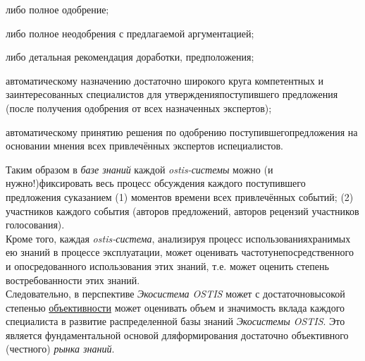\begin{scnsubstruct}
{\begin{scnitemize}
\begin{scnitemizeii}
                \item либо полное одобрение;
                \item либо полное неодобрения с предлагаемой аргументацией;
                \item либо детальная рекомендация доработки, предположения;
            \end{scnitemizeii}
            \item автоматическому назначению достаточно широкого круга компетентных и заинтересованных специалистов для утвержденияпоступившего предложения (после получения одобрения от всех назначенных экспертов);
            \item автоматическому принятию решения по одобрению поступившегопредложения на основании мнения всех привлечённых экспертов испециалистов.
        \end{scnitemize}
        Таким образом в \textit{базе знаний} каждой \textit{ostis-системы} можно (и нужно!)фиксировать весь процесс обсуждения каждого поступившего предложения суказанием (1) моментов времени всех привлечённых событий; (2) участников каждого события (авторов предложений, авторов рецензий участников голосования).\\
        Кроме того, каждая \textit{ostis-система}, анализируя процесс использованияхранимых ею знаний в процессе эксплуатации, может оценивать частотунепосредственного и опосредованного использования этих знаний, т.е. может оценить степень востребованности этих знаний.\\
        Следовательно, в перспективе \textit{Экосистема OSTIS} может с достаточновысокой степенью \uline{объективности} может оценивать объем и значимость вклада каждого специалиста в развитие распределенной базы знаний \textit{Экосистемы OSTIS}. Это является фундаментальной основой дляформирования достаточно объективного (честного) \textit{рынка знаний}.}
        

\end{scnsubstruct}
